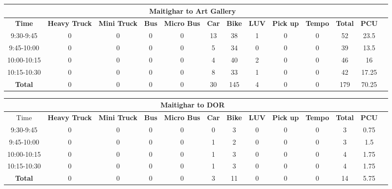 \begin{landscape}
\centering
\begin{table}[h!]
\centering
\begin{tabular}{|c|c|c|c|c|c|c|c|c|c|c|c|c|}
    \hline
    \multicolumn{12}{|c|}{\textbf{Maitighar to Art Gallery}} \\
    \hline
    \textbf{Time} & \textbf{Heavy Truck} & \textbf{Mini Truck} & \textbf{Bus} & \textbf{Micro Bus} & \textbf{Car} & \textbf{Bike} & \textbf{LUV} & \textbf{Pick up} & \textbf{Tempo} & \textbf{\textbf{Total}} & \textbf{PCU} \\
    \hline
9:30-9:45	&0	&0	&0	&0	&13	&38	&1	&0	&0	&52	&23.5 \\ \hline
9:45-10:00	&0	&0	&0	&0	&5	&34	&0	&0	&0	&39	&13.5 \\ \hline
10:00-10:15	&0	&0	&0	&0	&4	&40	&2	&0	&0	&46	&16 \\ \hline
10:15-10:30	&0	&0	&0	&0	&8	&33	&1	&0	&0	&42	&17.25 \\ \hline
\textbf{Total}	&0	&0	&0	&0	&30	&145	&4	&0	&0	&179	&70.25 \\ \hline

\end{tabular}

\vspace{0.5cm}

\begin{tabular}{|c|c|c|c|c|c|c|c|c|c|c|c|c|}
    \hline
    \multicolumn{12}{|c|}{\textbf{Maitighar to DOR}} \\
    \hline
        Time & \textbf{Heavy Truck} & \textbf{Mini Truck} & \textbf{Bus} & \textbf{Micro Bus} & \textbf{Car} & \textbf{Bike} & \textbf{LUV} & \textbf{Pick up} & \textbf{Tempo} & \textbf{\textbf{Total}} & \textbf{PCU} \\
    \hline
9:30-9:45	&0	&0	&0	&0	&0	&3	&0	&0	&0	&3	&0.75 \\ \hline
9:45-10:00	&0	&0	&0	&0	&1	&2	&0	&0	&0	&3	&1.5 \\ \hline
10:00-10:15	&0	&0	&0	&0	&1	&3	&0	&0	&0	&4	&1.75 \\ \hline
10:15-10:30	&0	&0	&0	&0	&1	&3	&0	&0	&0	&4	&1.75 \\ \hline
\textbf{Total}	&0	&0	&0	&0	&3	&11	&0	&0	&0	&14	&5.75 \\ \hline

\end{tabular}
\end{table}
\end{landscape}



